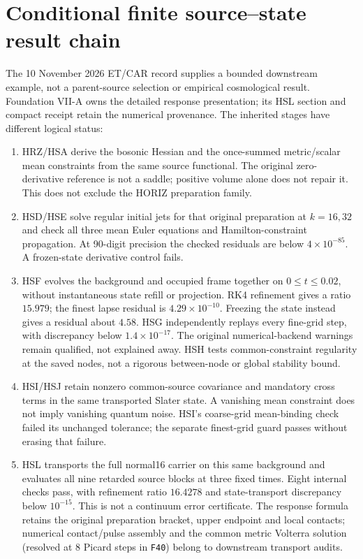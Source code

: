 \documentclass[11pt,a4paper]{article}
\theoremstyle{remark}
\begin{document}
\section{Conditional finite source--state result chain}
\label{sec:etcar-chain-20261110}
The 10 November 2026 ET/CAR record supplies a bounded downstream example,
not a parent-source selection or empirical cosmological result.
Foundation VII-A owns the detailed response presentation; its HSL section
and compact receipt retain the numerical provenance.
The inherited stages have different logical status:
\begin{enumerate}
\item HRZ/HSA derive the bosonic Hessian and the once-summed metric/scalar
mean constraints from the same source functional. The original
zero-derivative reference is not a saddle; positive volume alone does not
repair it. This does not exclude the HORIZ preparation family.
\item HSD/HSE solve regular initial jets for that original preparation
at $k=16,32$ and check all three mean Euler equations and Hamilton-constraint
propagation. At 90-digit precision the checked residuals are below
$4\times10^{-85}$. A frozen-state derivative control fails.
\item HSF evolves the background and occupied frame together on
$0\leq t\leq0.02$, without instantaneous state refill or projection.
RK4 refinement gives a ratio $15.979$; the finest lapse residual is
$4.29\times10^{-10}$. Freezing the state instead gives a residual about
$4.58$. HSG independently replays every fine-grid step, with discrepancy
below $1.4\times10^{-17}$. The original numerical-backend warnings remain
qualified, not explained away. HSH tests common-constraint regularity
at the saved nodes, not a rigorous between-node or global stability bound.
\item HSI/HSJ retain nonzero common-source covariance and mandatory cross
terms in the same transported Slater state. A vanishing mean constraint
does not imply vanishing quantum noise. HSI's coarse-grid mean-binding
check failed its unchanged tolerance; the separate finest-grid guard
passes without erasing that failure.
\item HSL transports the full normal16 carrier on this same background and
evaluates all nine retarded source blocks at three fixed times.
Eight internal checks pass, with refinement ratio $16.4278$ and
state-transport discrepancy below $10^{-15}$. This is not a continuum
error certificate. The response formula retains the original preparation
bracket, upper endpoint and local contacts; numerical contact/pulse assembly
and the common metric Volterra solution (resolved at 8 Picard steps in \texttt{F40})
belong to downstream transport audits.
\end{enumerate}
\end{document}
